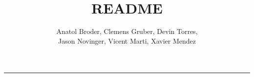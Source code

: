 \documentclass[a4paper]{article}
\title{README}
\author{Anatol Broder, Clemens Gruber, Devin Torres, \\%
Jason Novinger, Vicent Marti, Xavier Mendez}
\date{} %
\begin{document}
\maketitle
\hrule

\end{document}
